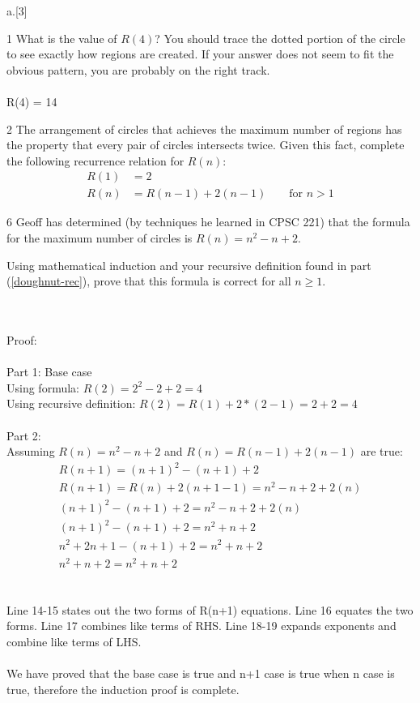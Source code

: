   \begin{question}{a.}[3]
  \item[1] What is the value of $R(4)$? You should trace the dotted portion of the circle to see exactly how regions are created. If your answer does not seem to fit the obvious pattern, you are probably on the right track.
  \\{\color{NavyBlue}
  \\R(4) = 14
  \\}
  
  \item[2] \label{doughnut-rec} The arrangement of circles that achieves the maximum number of regions has the property that every pair of circles intersects twice.
Given this fact, complete the following recurrence relation for $R(n)$:
{\color{NavyBlue}
\begin{align*}
R(1) &= 2\\
R(n) &= R(n-1) + 2(n-1) \qquad \text{for $n>1$}
\end{align*}
  }
  \item[6] Geoff has determined (by techniques he learned in CPSC 221) that the formula for the maximum number of circles is $R(n)=n^{2} - n + 2$.
  
  Using mathematical induction and your recursive definition found in part (\ref{doughnut-rec}), prove that this formula is correct for all $n \geq 1$.
  \begin{Questions}
  \\{\color{NavyBlue}
  \\Proof:
 \\
 \\Part 1: Base case
 \\Using formula: $R(2) = 2^2-2+2=4$
 \\Using recursive definition: $R(2) = R(1)+2*(2-1) = 2+2= 4$ 
 \\
 \\Part 2:
 \\Assuming $R(n)=n^{2} - n + 2$ and $R(n) = R(n-1) + 2(n-1)$ are true:
 \begin{gather}
 R(n+1)=(n+1)^{2} - (n+1) + 2\\
 R(n+1)=R(n)+2(n+1-1)=n^{2} - n + 2+2(n)\\
 (n+1)^{2} - (n+1) + 2=n^{2} - n + 2+2(n)\\
 (n+1)^{2} - (n+1) + 2=n^{2} +n+2\\
 n^{2}+2n+1 - (n+1) + 2=n^{2} +n+2\\
 n^{2} +n+2=n^{2} +n+2
 \end{gather} 
 \\
 \\Line 14-15 states out the two forms of R(n+1) equations. Line 16 equates the two forms. Line 17 combines like terms of RHS. Line 18-19 expands exponents and combine like terms of LHS.
 \\
 \\We have proved that the base case is true and n+1 case is true when n case is true, therefore the induction proof is complete.
 \\ }
 \begin{figure}[H]
\begin{verbatim}  


\end{verbatim}
\end{figure}
\end{Questions}
\end{question}
